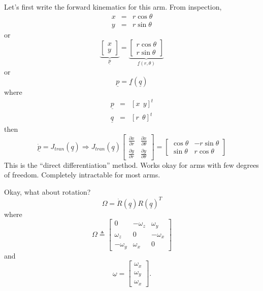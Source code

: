 \documentclass[]{article}
\begin{document}
Let's first write the forward kinematics for this arm. From inspection,
\begin{eqnarray}
x & = & r \cos \theta \nonumber \\
y & = & r \sin \theta \nonumber
\end{eqnarray}
or
\begin{displaymath}
	\underbrace{\left[ \begin{array}{c} x \\ y \end{array} \right]}_{\underline{p}} = \underbrace{\left[ \begin{array}{c} r \cos \theta \\ r \sin \theta \end{array} \right]}_{\underline{f}(r, \theta)}
\end{displaymath}
or
\begin{displaymath}
	\underline{p} = \underline{f}(\underline{q})
\end{displaymath}
where
\begin{eqnarray}
\underline{p} & = & [x\ \ y]^{t} \nonumber \\
\underline{q} & = & [r\ \ \theta]^{t} \nonumber
\end{eqnarray}
then
\begin{equation}
	\dot{\underline{p}} = J_{tran}(\underline{q}) \Rightarrow J_{tran}(\underline{q}) \left[ \begin{array}{cc} \frac{\partial x}{\partial r} & \frac{\partial x}{\partial \theta} \\ \frac{\partial y}{\partial r} & \frac{\partial y}{\partial \theta} \end{array} \right] = \left[ \begin{array}{cc} \cos \theta & -r \sin \theta \\ \sin \theta & r \cos \theta \end{array} \right]
\end{equation}
This is the ``direct differentiation'' method. Works okay for arms with few degrees of freedom. Completely intractable for most arms.

Okay, what about rotation?
\begin{displaymath}
	\Omega = \dot{R}(\underline{q})R(\underline{q})^{T}
\end{displaymath}
where
\begin{displaymath}
\Omega \triangleq \left[ \begin{array}{ccc} 0 & -\omega_{z} & \omega_{y} \\
\omega_{z} & 0 & -\omega_{x} \\ -\omega_{y} & \omega_{x} & 0 \end{array} \right]
\end{displaymath}
and
\begin{displaymath}
\underline{\omega} = \left[ \begin{array}{c} \omega_{x} \\ \omega_{y} \\ \omega_{x} \end{array} \right].
\end{displaymath}
\\
\end{document}
